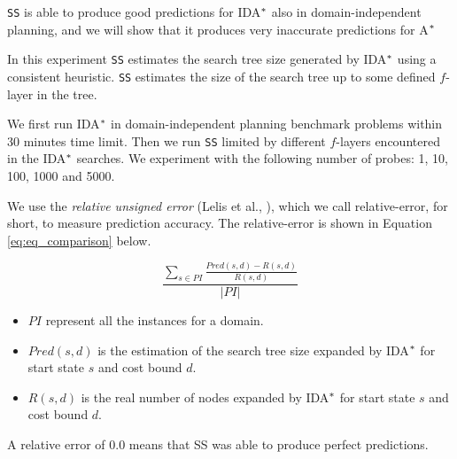 \texttt{SS} is able to produce good predictions for IDA$\sp{*}$ also in domain-independent planning, and we will show that it produces very inaccurate predictions for A$\sp{*}$

In this experiment \texttt{SS} estimates the search tree size generated by IDA$\sp{*}$ using a consistent heuristic. \texttt{SS} estimates the size of the search tree up to some defined $f$-layer in the tree.

We first run IDA$\sp{*}$ in domain-independent planning benchmark problems within 30 minutes time limit. Then we run \texttt{SS} limited by different $f$-layers encountered in the IDA$\sp{*}$ searches. We experiment with the following number of probes: 1, 10, 100, 1000 and 5000.

We use the \textit{relative unsigned error} (Lelis et al., \citeyear{lelis2012fast}), which we call relative-error, for short, to measure prediction accuracy. The relative-error is shown in Equation \ref{eq:eq_comparison} below.

\begin{equation}
\frac{\sum_{s\in PI} \frac{Pred(s, d) - R(s, d)}{R(s, d)}}{|PI|}
\label{eq:eq_comparison}
\end{equation}

\begin{itemize}
  \item $PI$ represent all the instances for a domain.
  \item $Pred(s,d)$ is the estimation of the search tree size expanded by IDA$\sp{*}$ for start state $s$ and cost bound $d$.
  \item $R(s,d)$ is the real number of nodes expanded by IDA$\sp{*}$ for start state $s$ and cost bound $d$.
\end{itemize}
A relative error of 0.0 means that SS was able to produce perfect predictions.

